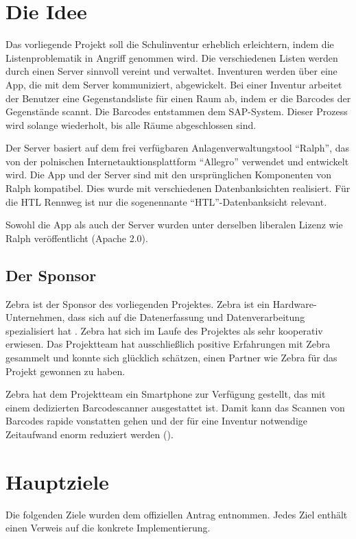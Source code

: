 \documentclass[
    headings=optiontotocandhead,%
    twoside,
    numbers=noenddot,%
    toc=flat, %
    12pt, %
    titlepage, %
    parskip=full, %
    listof=totoc, %
    listof=flat, %
    numbers=noenddot, %
    bibliography=totoc, %
    a4paper,DIV=14,
    BCOR=15mm,
]{scrbook}
\begin{document}
\section{Die Idee}

Das vorliegende Projekt soll die Schulinventur erheblich erleichtern, indem die Listenproblematik in Angriff genommen wird. Die verschiedenen Listen werden durch einen Server sinnvoll vereint und verwaltet. Inventuren werden über eine App, die mit dem Server kommuniziert, abgewickelt. Bei einer Inventur arbeitet der Benutzer eine Gegenstandsliste für einen Raum ab, indem er die Barcodes der Gegenstände scannt. Die Barcodes entstammen dem SAP-System. Dieser Prozess wird solange wiederholt, bis alle Räume abgeschlossen sind.

Der Server basiert auf dem frei verfügbaren Anlagenverwaltungstool ``Ralph'', das von der polnischen Internetauktionsplattform ``Allegro'' verwendet und entwickelt wird. Die App und der Server sind mit den ursprünglichen Komponenten von Ralph kompatibel. Dies wurde mit verschiedenen Datenbanksichten realisiert. Für die HTL Rennweg ist nur die sogenennante ``HTL''-Datenbanksicht relevant. 

Sowohl die App als auch der Server wurden unter derselben liberalen Lizenz wie Ralph veröffentlicht (Apache 2.0)\cite{ralph}. 

\subsection{Der Sponsor}
Zebra ist der Sponsor des vorliegenden Projektes. Zebra ist ein Hardware-Unternehmen, dass sich auf die Datenerfassung und Datenverarbeitung spezialisiert hat \cite{zebra}. Zebra hat sich im Laufe des Projektes als sehr kooperativ erwiesen. Das Projektteam hat ausschließlich positive Erfahrungen mit Zebra gesammelt und konnte sich glücklich schätzen, einen Partner wie Zebra für das Projekt gewonnen zu haben.

Zebra hat dem Projektteam ein Smartphone zur Verfügung gestellt, das mit einem dedizierten Barcodescanner ausgestattet ist. Damit kann das Scannen von Barcodes rapide vonstatten gehen und der für eine Inventur notwendige Zeitaufwand enorm reduziert werden (). 

\section{Hauptziele}


Die folgenden Ziele wurden dem offiziellen Antrag entnommen. Jedes Ziel enthält einen Verweis auf die konkrete Implementierung.
\end{document}
